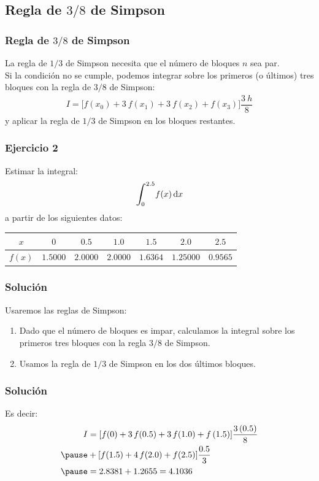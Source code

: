\documentclass[12pt]{beamer}
\begin{document}
\subsection{Regla de \texorpdfstring{$3/8$}{3/8} de Simpson}

\begin{frame}
\frametitle{Regla de $3/8$ de Simpson}
La regla de $1/3$ de Simpson necesita que el número de bloques $n$ sea par.
\\
\bigskip
\pause
Si la condición no se cumple, podemos integrar sobre los primeros (o últimos) tres bloques con la regla de $3/8$ de Simpson:
\pause
\begin{align*}
I = \bigg[ f (x_{0}) + 3 \: f (x_{1}) + 3 \: f (x_{2}) + f (x_{3}) \bigg] \dfrac{3 \: h}{8}
\end{align*}
y aplicar la regla de $1/3$ de Simpson en los bloques restantes.
\end{frame}
\begin{frame}
\frametitle{Ejercicio 2}
Estimar la integral:
\begin{align*}
\scaleint{6ex}_{\bs 0}^{2.5} f (x) \dd{x}
\end{align*}
a partir de los siguientes datos:
\pause
\fontsize{12}{12}\selectfont
\begin{center}
\begin{tabular}{c | c | c | c | c | c | c}
\hline
$x$ & $0$ & $0.5$ & $1.0$ & $1.5$ & $2.0$ & $2.5$ \\ \hline
$f (x)$ & $1.5000$ & $2.0000$ & $2.0000$ & $1.6364$ & $1.2500$0 & $0.9565$ \\ \hline
\end{tabular}
\end{center}
\end{frame}
\begin{frame}
\frametitle{Solución}
Usaremos las reglas de Simpson:
\pause
{}
\begin{enumerate}[<+->]
\item Dado que el número de bloques es impar, calculamos la integral sobre los primeros tres bloques con la regla $3/8$ de Simpson.
\item Usamos la regla de $1/3$ de Simpson en los dos últimos bloques.
\end{enumerate}
\end{frame}
\begin{frame}
\frametitle{Solución}
Es decir:
\pause
\begin{eqnarray*}
\begin{aligned}
I &= [f (0) + 3 \, f (0.5) + 3 \, f(1.0) + f \, (1.5)]\dfrac{3 \, (0.5)}{8} \\ \pause
&+ [ f (1.5) + 4 \, f (2.0) + f (2.5)] \dfrac{0.5}{3} \\ \pause
&= 2.8381 + 1.2655 = 4.1036
\end{aligned}
\end{eqnarray*}
\end{frame}
\end{document}

